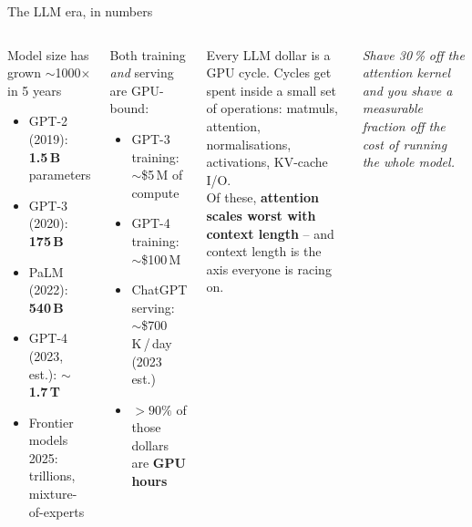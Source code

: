 \documentclass[10pt,aspectratio=169]{beamer}
\begin{document}
\begin{frame}{The LLM era, in numbers}
  \begin{columns}[T]
      \begin{block}{Model size has grown $\sim$1000$\times$ in 5 years}
        \begin{itemize}
          \item GPT-2 (2019): \textbf{1.5\,B} parameters
          \item GPT-3 (2020): \textbf{175\,B}
          \item PaLM (2022): \textbf{540\,B}
          \item GPT-4 (2023, est.): \textbf{$\sim$1.7\,T}
          \item Frontier models 2025: trillions, mixture-of-experts
        \end{itemize}
      \end{block}
      \begin{watchout}
        Both training \emph{and} serving are GPU-bound:
        \begin{itemize}
          \item GPT-3 training: $\sim$\$5\,M of compute
          \item GPT-4 training: $\sim$\$100\,M
          \item ChatGPT serving: $\sim$\$700\,K\,/\,day (2023 est.)
          \item $> 90\%$ of those dollars are \textbf{GPU hours}
        \end{itemize}
      \end{watchout}
      \begin{aha}
        Every LLM dollar is a GPU cycle. Cycles get spent inside a
        small set of operations: matmuls, attention, normalisations,
        activations, KV-cache I/O.\\[6pt]
        Of these, \textbf{attention scales worst with context length} --
        and context length is the axis everyone is racing on.
      \end{aha}
      \vspace{0.4em}
      {\small\itshape Shave 30\,\% off the attention kernel and you
      shave a measurable fraction off the cost of \emph{running the
      whole model}.}
  \end{columns}
\end{frame}
\end{document}
